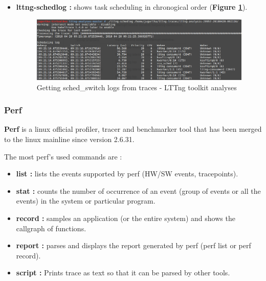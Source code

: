 \begin{itemize}
\begin{itemize}
			
			\item \textbf{lttng-schedlog : } shows task scheduling in chronogical order (\textbf{Figure \ref{Getting sched-switch logs from traces - LTTng toolkit analyses}}).
					\begin{figure}[H]
						\centering
        				\includegraphics[scale=0.35]{img/solution/lttng-schedlog.png}
        				\caption{Getting sched\_switch logs from traces - LTTng toolkit analyses}
        				\label{Getting sched-switch logs from traces - LTTng toolkit analyses}
    				\end{figure}		
			
			
		\end{itemize}			
	
	
\end{itemize}


\subsubsection{Perf}
\textbf{Perf} is a linux official profiler, tracer and benchmarker tool that has been merged to the linux mainline since version 2.6.31.

The most perf's used commands are :
\begin{itemize}
	\item \textbf{list :} lists the events supported by perf (HW/SW events, tracepoints).
	\item \textbf{stat :} counts the number of occurrence of an event (group of events or all the events) in the system or
particular program.
	\item \textbf{record :} samples an application (or the entire system) and shows the callgraph of functions.
	\item \textbf{report :} parses and displays the report generated by perf (perf list or perf record).
	\item \textbf{script :} Prints trace as text so that it can be parsed by other tools.
\end{itemize}

